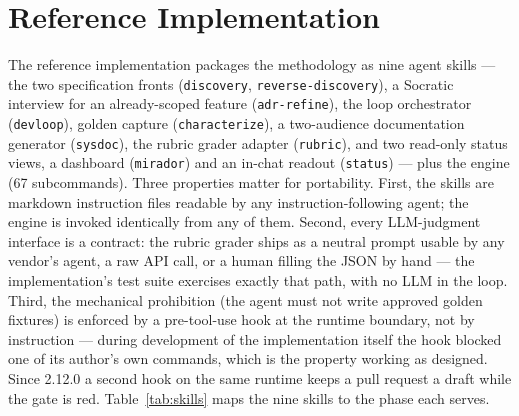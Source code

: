 \documentclass[11pt]{article}
\begin{document}
\section{Reference Implementation}\label{sec:impl}

The reference implementation packages the methodology as nine agent skills
--- the two specification fronts (\texttt{discovery}, \texttt{reverse-discovery}),
a Socratic interview for an already-scoped feature (\texttt{adr-refine}), the
loop orchestrator (\texttt{devloop}), golden capture (\texttt{characterize}), a
two-audience documentation generator (\texttt{sysdoc}), the rubric grader adapter
(\texttt{rubric}), and two read-only status views, a dashboard
(\texttt{mirador}) and an in-chat readout (\texttt{status}) --- plus the engine
(67 subcommands). Three
properties matter for portability. First, the skills are markdown instruction
files readable by any instruction-following agent; the engine is invoked
identically from any of them. Second, every LLM-judgment interface is a
contract: the rubric grader ships as a neutral prompt usable by any vendor's
agent, a raw API call, or a human filling the JSON by hand --- the
implementation's test suite exercises exactly that path, with no LLM in the
loop. Third, the mechanical prohibition (the agent must not write approved
golden fixtures) is enforced by a pre-tool-use hook at the runtime boundary,
not by instruction --- during development of the implementation itself the hook
blocked one of its author's own commands, which is the property working as
designed. Since 2.12.0 a second hook on the same runtime keeps a pull request a draft while the gate is red. Table~\ref{tab:skills} maps the nine skills to the phase each serves.
\end{document}
